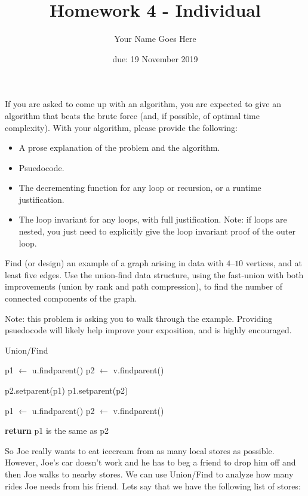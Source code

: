 \documentclass{article}
\author{Your Name Goes Here}
\date{due: 19 November 2019}
\title{Homework 4 - Individual}
\begin{document}
\maketitle

If you are asked to come up with an algorithm, you are expected to give an
algorithm that beats the brute force (and, if possible, of optimal time
complexity).
With your algorithm, please provide the following:
\begin{itemize}
\item A prose explanation of the problem and the algorithm.
\item Psuedocode.
\item The decrementing function for any loop or recursion, or a runtime
justification.
\item The loop invariant for any loops, with full justification.  Note: if
loops are nested, you just need to explicitly give the loop invariant
proof of the outer loop.
\end{itemize}

\nextprob
Find (or design) an example of a graph arising in data
with $4$--$10$ vertices, and at least five
edges.  Use the union-find data structure, using the fast-union with both
improvements (union by rank and path compression), to find the number of
connected components of the graph.

Note: this problem is asking you to walk through the example.  Providing
psuedocode will likely help improve your exposition, and is highly encouraged.

\begin{algorithm}
\caption{Union/Find}\label{guests}
\begin{algorithmic}[1]
	\State p1 $\gets$ u.findparent()
	\State p2 $\gets$ v.findparent()
	
		\State p2.setparent(p1)
	\Else
		\State p1.setparent(p2)
	\EndIf
\EndFunction
\end{algorithmic}
\begin{algorithmic}[1]
	\State p1 $\gets$ u.findparent()
	\State p2 $\gets$ v.findparent()
	
	\State \textbf{return} p1 is the same as p2
\EndFunction
\end{algorithmic}
\end{algorithm}

So Joe really wants to eat icecream from as many local stores as possible. However, Joe's car doesn't work and he has to beg a friend to drop him off and then Joe walks to nearby stores. We can use Union/Find to analyze how many rides Joe needs from his friend. Lets say that we have the following list of stores:
\end{document}
